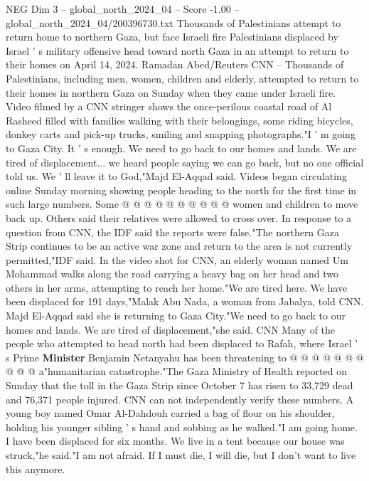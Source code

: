 \begin{textsample}{NEG Dim 3 – global\_north\_2024\_04 – Score -1.00 – global\_north\_2024\_04/200396730.txt}  \label{ex:f3_neg_387}
Thousands of Palestinians attempt to return home to northern Gaza, but face Israeli fire Palestinians displaced by Israel ' s military offensive head toward north Gaza in an attempt to return to their homes on April 14, 2024.
Ramadan Abed/Reuters CNN -- Thousands of Palestinians, including men, women, children and elderly, attempted to return to their homes in northern Gaza on Sunday when they came under Israeli fire.
Video filmed by a CNN stringer shows the once-perilous coastal road of Al Rasheed filled with families walking with their belongings, some riding bicycles, donkey carts and pick-up trucks, smiling and snapping photographs."I ' m going to Gaza City.
It ' s enough.
We need to go back to our homes and lands.
We are tired of displacement... we heard people saying we can go back, but no one official told us.
We ' ll leave it to God,"Majd El-Aqqad said.
Videos began circulating online Sunday morning showing people heading to the north for the first time in such large numbers.
Some @ @ @ @ @ @ @ @ @ @ women and children to move back up.
Others said their relatives were allowed to cross over.
In response to a question from CNN, the IDF said the reports were false."The northern Gaza Strip continues to be an active war zone and return to the area is not currently permitted,"IDF said.
In the video shot for CNN, an elderly woman named Um Mohammad walks along the road carrying a heavy bag on her head and two others in her arms, attempting to reach her home."We are tired here.
We have been displaced for 191 days,"Malak Abu Nada, a woman from Jabalya, told CNN.
Majd El-Aqqad said she is returning to Gaza City."We need to go back to our homes and lands.
We are tired of displacement,"she said.
CNN Many of the people who attempted to head north had been displaced to Rafah, where Israel ' s Prime \textbf{Minister} Benjamin Netanyahu has been threatening to @ @ @ @ @ @ @ @ @ @ a"humanitarian catastrophe."The Gaza Ministry of Health reported on Sunday that the toll in the Gaza Strip since October 7 has risen to 33,729 dead and 76,371 people injured.
CNN can not independently verify these numbers.
A young boy named Omar Al-Dahdouh carried a bag of flour on his shoulder, holding his younger sibling ' s hand and sobbing as he walked."I am going home.
I have been displaced for six months.
We live in a tent because our house was struck,"he said."I am not afraid.
If I must die, I will die, but I don't want to live this anymore.

\end{textsample}
